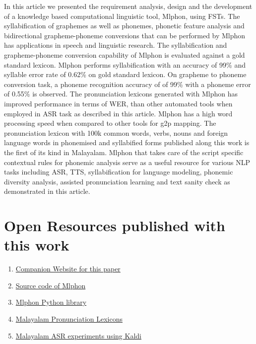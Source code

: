 \documentclass{ieeeaccess}
\begin{document}
In this article we presented the requirement analysis, design and the development of a knowledge based computational linguistic tool, Mlphon, using FSTs. The syllabification of graphemes as well as phonemes, phonetic feature analysis and bidirectional grapheme-phoneme conversions that can be performed by Mlphon has applications in speech and linguistic research. The syllabification and grapheme-phoneme conversion capability of Mlphon is evaluated against a gold standard lexicon. Mlphon performs syllabification with an  accuracy of 99\% and syllable error rate of 0.62\% on gold standard lexicon. On grapheme to phoneme conversion task, a phoneme recognition accuracy of of 99\%  with a phoneme error of  0.55\% is observed. The pronunciation lexicons generated with Mlphon has improved performance in terms of WER, than other automated tools when employed in ASR task as described in this article. Mlphon has a high word processing speed when compared to other tools for g2p mapping. The pronunciation lexicon with 100k common words, verbs, nouns and foreign language words in phonemised and syllabified forms published along this work is the first of its kind in Malayalam.  Mlphon that takes care of the script specific contextual rules for phonemic analysis serve as a useful resource for various NLP tasks including ASR, TTS, syllabification for language modeling, phonemic diversity analysis, assisted pronunciation learning and text sanity check as demonstrated in this article.
\appendices


\section{Open Resources published with this work}
\label{resources}
\begin{enumerate}
    \item \href{https://phon.smc.org.in/}{Companion Website for this paper} 
	\item \href{https://github.com/kavyamanohar/mlphon}{Source code of Mlphon}
	\item \href{https://pypi.org/project/mlphon/}{Mlphon Python library}
	\item \href{https://gitlab.com/kavyamanohar/malayalam-phonetic-lexicon}{Malayalam Pronunciation Lexicons}
	\item \href{https://gitlab.com/kavyamanohar/asr-malayalam}{Malayalam ASR experiments using Kaldi}
\end{enumerate}


\end{document}
